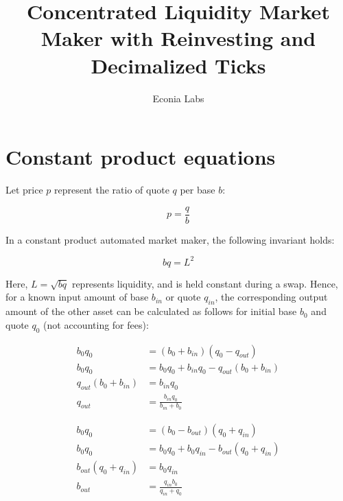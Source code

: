 \documentclass[twocolumn]{article}
\begin{document}
\title{Concentrated Liquidity Market Maker with Reinvesting and Decimalized Ticks}
\author{Econia Labs}
\date{}

\maketitle

\section{Constant product equations}

Let price $p$ represent the ratio of quote $q$ per base $b$:

\begin{equation} \label{eqn:price}
  p = \frac{q}{b}
\end{equation}

In a constant product automated market maker, the following invariant holds:

\begin{equation} \label{eqn:liquidity}
  bq = L^2
\end{equation}

Here, $L = \sqrt{bq}$ represents liquidity, and is held constant during a swap.
Hence, for a known input amount of base $b_{in}$ or quote $q_{in}$, the corresponding output amount
of the other asset can be calculated as follows for initial base $b_0$ and quote $q_0$ (not
accounting for fees):

\begin{align} \label{eqn:q-out-simple}
  b_0 q_0               & = (b_0 + b_{in})(q_0 - q_{out}) \nonumber                \\
  b_0 q_0               & = b_0 q_0 + b_{in} q_0 - q_{out}(b_0 + b_{in}) \nonumber \\
  q_{out}(b_0 + b_{in}) & = b_{in} q_0 \nonumber                                   \\
  q_{out}               & = \frac{b_{in} q_0}{b_{in} + b_0}
\end{align}

\begin{align} \label{eqn:b-out-simple}
  b_0 q_0               & = (b_0 - b_{out})(q_0 + q_{in}) \nonumber                \\
  b_0 q_0               & = b_0 q_0 + b_0 q_{in} - b_{out}(q_0 + q_{in}) \nonumber \\
  b_{out}(q_0 + q_{in}) & = b_{0} q_{in} \nonumber                                 \\
  b_{out}               & = \frac{q_{in} b_0}{q_{in} + q_0}
\end{align}
\end{document}
